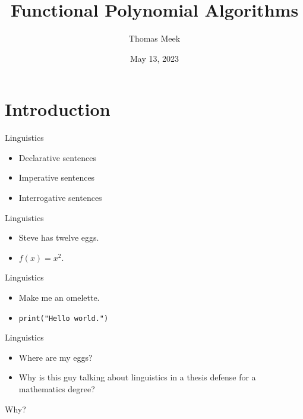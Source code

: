 \documentclass{beamer}
\title{Functional Polynomial Algorithms}
\author{Thomas Meek}
\date{May 13, 2023}
\begin{document}
\frame{\titlepage}

\section{Introduction}

\begin{frame}{Linguistics}
  \begin{itemize}
    \item<2-> Declarative sentences
    \item<3-> Imperative sentences
    \item<4> Interrogative sentences
  \end{itemize}
\end{frame}

\begin{frame}{Linguistics}
  \begin{itemize}
    \item<2-> Steve has twelve eggs.
    \item<3> $f(x) = x^2$.
  \end{itemize}
\end{frame}

\begin{frame}{Linguistics}
  \begin{itemize}
    \item<2-> Make me an omelette. 
    \item<3> \lstinline{print("Hello world.")}
  \end{itemize}
\end{frame}

\begin{frame}{Linguistics}
  \begin{itemize}
    \item<2-> Where are my eggs?
    \item<3-> Why is this guy talking about linguistics in a thesis defense for a mathematics degree?
  \end{itemize}
\end{frame}

\begin{frame}{Why?}
\end{frame}
\end{document}
